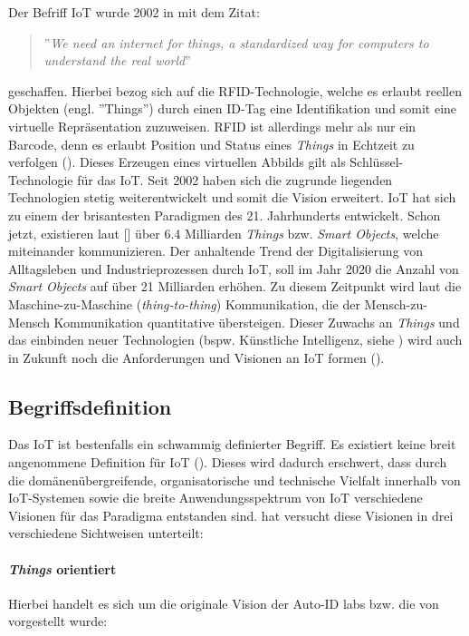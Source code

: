 Der Befriff \ac{IoT} wurde 2002 in \cite{ashton2009internet} mit dem Zitat:
\begin{quote}
    ''\textit{We need an internet for things, a standardized way for computers to understand the real world}''
\end{quote}
 geschaffen. Hierbei bezog sich \cite{ashton2009internet} auf die RFID-Technologie, welche es erlaubt reellen Objekten (engl. ''Things'') durch einen ID-Tag eine Identifikation und somit eine virtuelle Repräsentation zuzuweisen. RFID ist allerdings mehr als nur ein Barcode, denn es erlaubt Position und Status eines \textit{Things} in Echtzeit zu verfolgen (\cite{atzori2010internet}). Dieses Erzeugen eines virtuellen Abbilds gilt als Schlüssel-Technologie für das \ac{IoT}. Seit 2002 haben sich die zugrunde liegenden Technologien stetig weiterentwickelt und somit die Vision erweitert. \ac{IoT} hat sich zu einem der brisantesten Paradigmen des 21. Jahrhunderts entwickelt. Schon jetzt, existieren laut [\cite{gartnerIoT}] über 6.4 Milliarden \textit{Things} bzw. \textit{Smart Objects}, welche miteinander kommunizieren. Der anhaltende Trend der Digitalisierung von Alltagsleben und Industrieprozessen durch \ac{IoT}, soll im Jahr 2020 die Anzahl von \textit{Smart Objects} auf über 21 Milliarden erhöhen. Zu diesem Zeitpunkt wird laut \cite{tan2010future} die Maschine-zu-Maschine (\textit{thing-to-thing}) Kommunikation, die der Mensch-zu-Mensch Kommunikation quantitative übersteigen. Dieser Zuwachs an \textit{Things} und das einbinden neuer Technologien (bspw. Künstliche Intelligenz, siehe \cite{mehdi2017deeplearningIoT}) wird auch in Zukunft noch die Anforderungen und Visionen an \ac{IoT} formen (\cite{Gubbi.2013}).
 
\subsection{Begriffsdefinition}
Das \acl{IoT} ist bestenfalls ein schwammig definierter Begriff. Es existiert keine breit angenommene Definition für \ac{IoT} (\cite{atzori2010internet}). Dieses wird dadurch erschwert, dass durch die domänenübergreifende, organisatorische und technische Vielfalt innerhalb von \ac{IoT}-Systemen sowie die breite Anwendungsspektrum von \ac{IoT} verschiedene Visionen für das Paradigma entstanden sind. \cite{atzori2010internet} hat versucht diese Visionen in drei verschiedene Sichtweisen unterteilt: 

\paragraph{\textit{Things} orientiert} Hierbei handelt es sich um die originale Vision der Auto-ID labs bzw. die von \cite{sarma2000networked} vorgestellt wurde:

